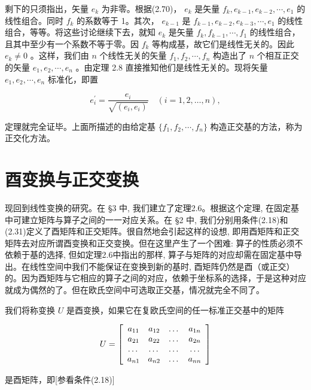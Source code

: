剩下的只须指出，矢量 $e_k$ 为非零。根据(2.70)， $e_k$ 是矢量 $f_k, e_{k-1}, e_{k-2}, \cdots, e_1$ 的线性组合。同时 $f_k$ 的系数等于 1。其次， $e_{k-1}$ 是 $f_{k-1}, e_{k-2}, e_{k-3}, \cdots, e_1$ 的线性组合，等等。将这些讨论继续下去，就知 $e_k$ 是矢量 $f_k, f_{k-1}, \cdots, f_1$ 的线性组合，且其中至少有一个系数不等于零。因 $f_k$ 等构成基，故它们是线性无关的。因此 $e_k \neq 0$ 。这样，我们由 $n$ 个线性无关的矢量 $f_1, f_2, \cdots, f_n$ 构造出了 $n$ 个相互正交的矢量 $e_1, e_2, \cdots, e_n$ 。由定理 2.8 直接推知他们是线性无关的。现将矢量 $e_1, e_2, \cdots, e_n$ 标准化，即置

\begin{equation*}
e _ {i} ^ {\prime} = \frac {e _ {i}}{\sqrt {(e _ {i} , e _ {i})}} \quad (i = 1, 2, \dots , n),
\end{equation*}

定理就完全证毕。上面所描述的由给定基 $\{f_{1},f_{2},\cdots,f_{n}\}$ 构造正交基的方法，称为正交化方法。

\section{酉变换与正交变换}

现回到线性变换的研究。在 §3 中, 我们建立了定理2.6。根据这个定理, 在固定基中可建立矩阵与算子之间的一一对应关系。在 §2 中, 我们分别用条件(2.18)和(2.31)定义了酉矩阵和正交矩阵。很自然地会引起这样的设想, 即用酉矩阵和正交矩阵去对应所谓酉变换和正交变换。但在这里产生了一个困难: 算子的性质必须不依赖于基的选择, 但如定理2.6中指出的那样, 算子与矩阵的对应却需在固定基中导出。在线性空间中我们不能保证在变换到新的基时, 酉矩阵仍然是酉（或正交）的。因为酉矩阵与它相应的算子之间的对应，依赖于坐标系的选择，于是这种对应就成为偶然的了。但在欧氏空间中可选取正交基，情况就完全不同了。

我们将称变换 $U$ 是酉变换，如果它在复欧氏空间的任一标准正交基中的矩阵

\begin{equation*}
U = \left[ \begin{array}{c c c c} a _ {1 1} & a _ {1 2} & \dots & a _ {1 n} \\ a _ {2 1} & a _ {2 2} & \dots & a _ {2 n} \\ \dots & \dots & \dots & \dots \\ a _ {n 1} & a _ {n 2} & \dots & a _ {n n} \end{array} \right]
\end{equation*}

是酉矩阵，即[参看条件(2.18)]

